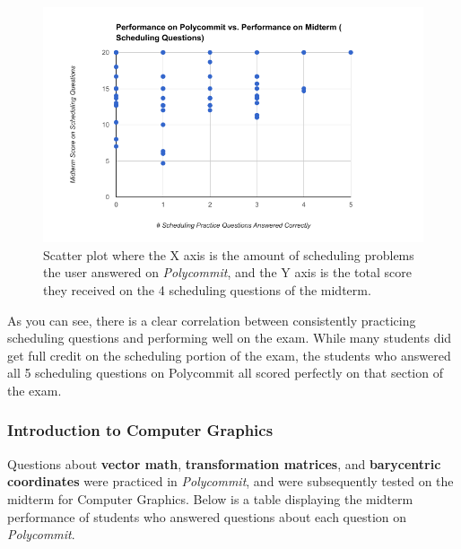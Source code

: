 
\begin{figure}[h!b]
	\includegraphics[width=1.0\linewidth]{figures/scheduling}
	\caption{Scatter plot where the X axis is the amount of scheduling problems the user answered on \textit{Polycommit}, and the Y axis is the total score they received on the 4 scheduling questions of the midterm.}
	\label{fig:scheduling}
\end{figure}

\par As you can see, there is a clear correlation between consistently practicing scheduling questions and performing well on the exam. While many students did get full credit on the scheduling portion of the exam, the students who answered all 5 scheduling questions on Polycommit all scored perfectly on that section of the exam.


\subsubsection{Introduction to Computer Graphics}

\par Questions about \textbf{vector math}, \textbf{transformation matrices}, and \textbf{barycentric coordinates} were practiced in \textit{Polycommit}, and were subsequently tested on the midterm for Computer Graphics. Below is a table displaying the midterm performance of students who answered questions about each question on \textit{Polycommit}.

